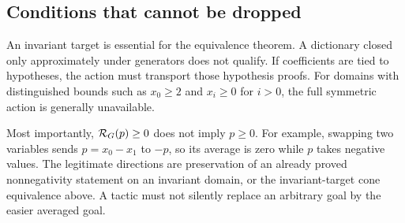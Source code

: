 \subsection{Conditions that cannot be dropped}
An invariant target is essential for the equivalence theorem. A dictionary closed only approximately under generators does not qualify. If coefficients are tied to hypotheses, the action must transport those hypothesis proofs. For domains with distinguished bounds such as $x_0\geq2$ and $x_i\geq0$ for $i>0$, the full symmetric action is generally unavailable.

Most importantly, $\mathcal R_G(p)\geq0$ does not imply $p\geq0$. For example, swapping two variables sends $p=x_0-x_1$ to $-p$, so its average is zero while $p$ takes negative values. The legitimate directions are preservation of an already proved nonnegativity statement on an invariant domain, or the invariant-target cone equivalence above. A tactic must not silently replace an arbitrary goal by the easier averaged goal.
